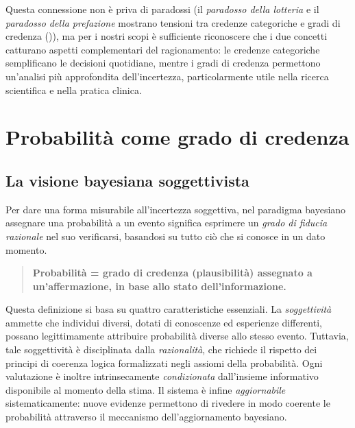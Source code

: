 \documentclass[
  letterpaper,
  DIV=11,
  numbers=noendperiod,
  oneside]{scrreprt}
\theoremstyle{definition}
\theoremstyle{plain}
\theoremstyle{definition}
\theoremstyle{remark}
\begin{document}
\begin{tcolorbox}
Questa connessione non è priva di paradossi (il \emph{paradosso della
lotteria} e il \emph{paradosso della prefazione} mostrano tensioni tra
credenze categoriche e gradi di credenza
()), ma per i
nostri scopi è sufficiente riconoscere che i due concetti catturano
aspetti complementari del ragionamento: le credenze categoriche
semplificano le decisioni quotidiane, mentre i gradi di credenza
permettono un'analisi più approfondita dell'incertezza, particolarmente
utile nella ricerca scientifica e nella pratica clinica.

\end{tcolorbox}

\section{Probabilità come grado di
credenza}\label{probabilituxe0-come-grado-di-credenza}

\subsection{La visione bayesiana
soggettivista}\label{la-visione-bayesiana-soggettivista}

Per dare una forma misurabile all'incertezza soggettiva, nel paradigma
bayesiano assegnare una probabilità a un evento significa esprimere un
\emph{grado di fiducia razionale} nel suo verificarsi, basandosi su
tutto ciò che si conosce in un dato momento.

\begin{quote}
\textbf{Probabilità = grado di credenza (plausibilità) assegnato a
un'affermazione, in base allo stato dell'informazione.}
\end{quote}

Questa definizione si basa su quattro caratteristiche essenziali. La
\emph{soggettività} ammette che individui diversi, dotati di conoscenze
ed esperienze differenti, possano legittimamente attribuire probabilità
diverse allo stesso evento. Tuttavia, tale soggettività è disciplinata
dalla \emph{razionalità}, che richiede il rispetto dei principi di
coerenza logica formalizzati negli assiomi della probabilità. Ogni
valutazione è inoltre intrinsecamente \emph{condizionata} dall'insieme
informativo disponibile al momento della stima. Il sistema è infine
\emph{aggiornabile} sistematicamente: nuove evidenze permettono di
rivedere in modo coerente le probabilità attraverso il meccanismo
dell'aggiornamento bayesiano.
\end{document}
